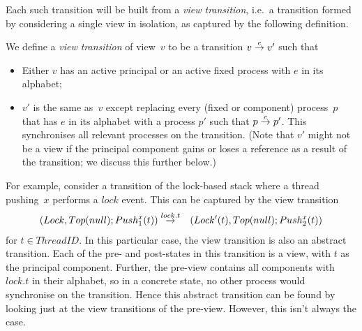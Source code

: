 %
Each such transition will be built from a \emph{view transition}, i.e.~a
transition formed by considering a single view in isolation, as captured by
the following definition.
%
\begin{definition}
We define a \emph{view transition} of view~$v$ to be a transition $v \stackrel{e}\rightarrow
v'$ such that
%
\begin{itemize}
\item Either $v$ has an active principal or an active fixed process with $e$
  in its alphabet;

\item $v'$ is the same as~$v$ except replacing every (fixed or component)
  process~$p$ that has $e$ in its alphabet with a process $p'$ such that \( p
  \stackrel{e}\rightarrow p' \).  This synchronises all relevant processes on the
  transition. (Note that $v'$ might not be a view if the principal component
  gains or loses a reference as a result of the transition; we discuss this
  further below.)
\end{itemize}
\end{definition}


For example, consider a transition of the lock-based stack where a thread
pushing~$x$ performs a $lock$ event.  This can be captured by the view
transition
%
\begin{eqnarray}
(Lock, Top(null); Push^x_1(t)) & \stackrel{lock.t}\rightarrow & 
  (Lock'(t), Top(null); Push^x_2(t))
\label{trans:lock}
\end{eqnarray}
%
for $t \in ThreadID$.  
%
In this particular case, the view transition is also an abstract transition.
Each of the pre- and post-states in this transition is a view, with $t$ as the
principal component.  Further, the pre-view contains all components with
$lock.t$ in their alphabet, so in a concrete state, no other process would
synchronise on the transition.  Hence this abstract transition can be found by
looking just at the view transitions of the pre-view.  However, this isn't
always the case.

